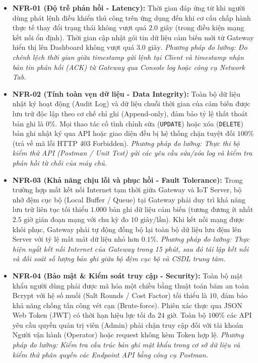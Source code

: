 \begin{itemize}
    \item \textbf{NFR-01 (Độ trễ phản hồi - Latency):} Thời gian đáp ứng từ khi người dùng phát lệnh điều khiển thủ công trên ứng dụng đến khi cơ cấu chấp hành thực tế thay đổi trạng thái không vượt quá $2.0\text{ giây}$ (trong điều kiện mạng kết nối ổn định). Thời gian cập nhật gói tin dữ liệu cảm biến mới từ Gateway hiển thị lên Dashboard không vượt quá $3.0\text{ giây}$. \textit{Phương pháp đo lường: Đo chênh lệch thời gian giữa timestamp gửi lệnh tại Client và timestamp nhận bản tin phản hồi (ACK) từ Gateway qua Console log hoặc công cụ Network Tab.}
    \item \textbf{NFR-02 (Tính toàn vẹn dữ liệu - Data Integrity):} Toàn bộ dữ liệu nhật ký hoạt động (Audit Log) và dữ liệu chuỗi thời gian của cảm biến được lưu trữ độc lập theo cơ chế chỉ ghi (Append-only), đảm bảo tỷ lệ thất thoát bản ghi là $0\%$. Mọi thao tác cố tình chỉnh sửa (\texttt{UPDATE}) hoặc xóa (\texttt{DELETE}) bản ghi nhật ký qua API hoặc giao diện đều bị hệ thống chặn tuyệt đối $100\%$ (trả về mã lỗi HTTP 403 Forbidden). \textit{Phương pháp đo lường: Thực thi bộ kiểm thử API (Postman / Unit Test) gửi các yêu cầu sửa/xóa log và kiểm tra phản hồi từ chối của máy chủ.}
    \item \textbf{NFR-03 (Khả năng chịu lỗi và phục hồi - Fault Tolerance):} Trong trường hợp mất kết nối Internet tạm thời giữa Gateway và IoT Server, bộ nhớ đệm cục bộ (Local Buffer / Queue) tại Gateway phải duy trì khả năng lưu trữ liên tục tối thiểu $1.000$ bản ghi dữ liệu cảm biến (tương đương ít nhất $2.5\text{ giờ}$ gián đoạn mạng với chu kỳ đo $10\text{ giây/lần}$). Khi kết nối mạng được khôi phục, Gateway phải tự động đồng bộ lại toàn bộ dữ liệu lưu đệm lên Server với tỷ lệ mất mát dữ liệu nhỏ hơn $0.1\%$. \textit{Phương pháp đo lường: Thực hiện ngắt kết nối Internet của Gateway trong 15 phút, sau đó tái lập kết nối và đối soát số lượng bản ghi giữa bộ đệm cục bộ và CSDL trung tâm.}
    \item \textbf{NFR-04 (Bảo mật \& Kiểm soát truy cập - Security):} Toàn bộ mật khẩu người dùng phải được mã hóa một chiều bằng thuật toán băm an toàn Bcrypt với hệ số muối (Salt Rounds / Cost Factor) tối thiểu là $10$, đảm bảo khả năng chống tấn công vét cạn (Brute-force). Phiên xác thực qua JSON Web Token (JWT) có thời hạn hiệu lực tối đa $24\text{ giờ}$. Toàn bộ $100\%$ các API yêu cầu quyền quản trị viên (Admin) phải chặn truy cập đối với tài khoản Người vận hành (Operator) hoặc request không kèm Token hợp lệ. \textit{Phương pháp đo lường: Kiểm tra cấu trúc bản ghi mật khẩu trong cơ sở dữ liệu và kiểm thử phân quyền các Endpoint API bằng công cụ Postman.}

\end{itemize}
